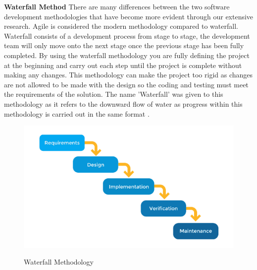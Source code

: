 \newpage
\textbf{Waterfall Method}
\newline
There are many differences between the two software development methodologies that have become more evident through our extensive research. Agile is considered the modern methodology compared to waterfall. Waterfall consists of a development process from stage to stage, the development team will only move onto the next stage once the previous stage has been fully completed. By using the waterfall methodology you are fully defining the project at the beginning and carry out each step until the project is complete without making any changes. This methodology can make the project too rigid as changes are not allowed to be made with the design so the coding and testing must meet the requirements of the solution.  The name 'Waterfall' was given to this methodology as it refers to the downward flow of water as progress within this methodology is carried out in the same format \cite{waterfall}.

\newline

\begin{figure}[H]
  \centering
  \includegraphics[scale=0.35]{img/waterfall.png}
  \caption{Waterfall Methodology}\cite{waterfall}
  \label{fig:Waterfall Methodology}
\end{figure}

